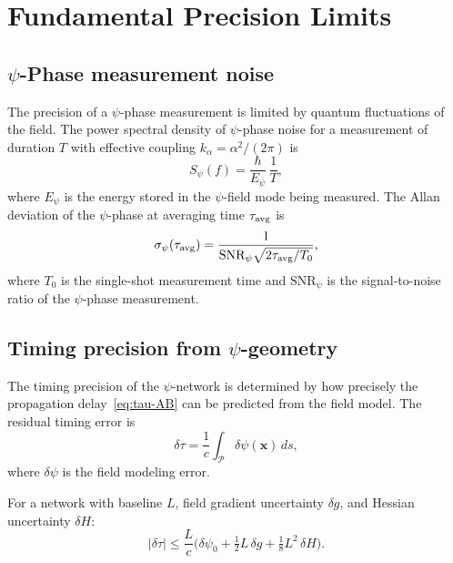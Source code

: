 \documentclass[aps,prd,twocolumn,superscriptaddress,nofootinbib]{revtex4-2}
\begin{document}
\section{Fundamental Precision Limits}\label{sec:precision}

\subsection{$\psi$-Phase measurement noise}\label{sec:phase-noise}

The precision of a $\psi$-phase measurement is limited by quantum
fluctuations of the field. The power spectral density of $\psi$-phase
noise for a measurement of duration $T$ with effective coupling
$k_\alpha = \alpha^2/(2\pi)$ is
\begin{equation}\label{eq:Spsi}
S_\psi(f) = \frac{\hbar}{E_\psi}\,\frac{1}{T},
\end{equation}
where $E_\psi$ is the energy stored in the $\psi$-field mode being
measured. The Allan deviation of the $\psi$-phase at averaging time
$\tau_{\rm avg}$ is
\begin{equation}\label{eq:sigma-psi}
\sigma_\psi(\tau_{\rm avg}) = \frac{1}{\text{SNR}_\psi\sqrt{2\tau_{\rm avg}/T_0}},
\end{equation}
where $T_0$ is the single-shot measurement time and $\text{SNR}_\psi$
is the signal-to-noise ratio of the $\psi$-phase measurement.

\subsection{Timing precision from $\psi$-geometry}\label{sec:timing-precision}

The timing precision of the $\psi$-network is determined by how precisely
the propagation delay~\eqref{eq:tau-AB} can be predicted from the
field model. The residual timing error is
\begin{equation}\label{eq:delta-tau}
\delta\tau = \frac{1}{c}\int_{\mathcal{P}} \delta\psi(\mathbf{x})\,ds,
\end{equation}
where $\delta\psi$ is the field modeling error.

For a network with baseline $L$, field gradient uncertainty
$\delta g$, and Hessian uncertainty $\delta H$:
\begin{equation}\label{eq:tau-error}
|\delta\tau| \leq \frac{L}{c}\bigl(\delta\psi_0 + \tfrac{1}{2}L\,\delta g
+ \tfrac{1}{8}L^2\,\delta H\bigr).
\end{equation}
\end{document}
